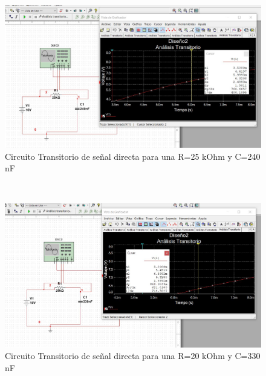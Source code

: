 \documentclass[twoside,twocolumn]{article}
\begin{document}
   \begin{figure}[h]
    \centering
    \includegraphics[scale=0.2]{Imagenes/3.2.JPG}
    \caption{Circuito Transitorio de señal directa para una R=25 kOhm y C=240 nF}
    \label{fig:circuito1}
  \end{figure}\\  
  
    \begin{figure}[h]
    \centering
    \includegraphics[scale=0.2]{Imagenes/3.3.JPG}
    \caption{Circuito Transitorio de señal directa para una R=20 kOhm y C=330 nF}
    \label{fig:circuito1}
  \end{figure}\\  

\newpage
\end{document}

